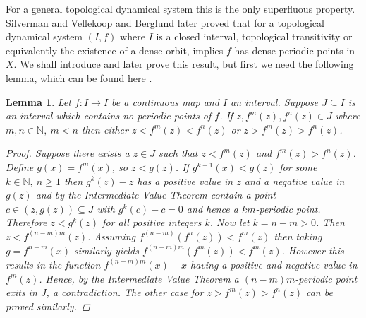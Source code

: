 \documentclass[11pt,a4paper,oneside]{memoir}
\theoremstyle{plain}
\newtheorem{lem}[thm]{Lemma}
\theoremstyle{definition}
\begin{document}
For a general topological dynamical system this is the only superfluous property. Silverman \cite{silverman} and Vellekoop and Berglund \cite{vellekoop-berglund} later proved that for a topological dynamical system $(I, f)$ where $I$ is a closed interval, topological transitivity or equivalently the existence of a dense orbit, implies $f$ has dense periodic points in $X$. We shall introduce and later prove this result, but first we need the following lemma, which can be found here \cite[Section 4.1]{block-coppel}.

\begin{lem} \label{lem:closed-interval-no-periodic-points}
    Let $f: I \to I$ be a continuous map and $I$ an interval. Suppose $J \subseteq I$ is an interval which contains no periodic points of $f$. If $z, f^m(z), f^n(z) \in J$ where $m, n \in \mathbb{N}, \ m < n$ then either $z < f^m(z) < f^n(z)$ or $z > f^m(z) > f^n(z)$.
    \begin{proof}
        Suppose there exists a $z \in J$ such that $z < f^m(z)$ and $f^m(z) > f^n(z)$. Define $g(x) = f^m(x)$, so $z < g(z)$. If $g^{k+1}(x) < g(z)$ for some $k \in \mathbb{N}, \ n \geq 1$ then $g^k(z) - z$ has a positive value in $z$ and a negative value in $g(z)$ and by the Intermediate Value Theorem contain a point $c \in (z, g(z)) \subseteq J$ with $g^k(c) - c = 0$ and hence a $km$-periodic point. Therefore $z < g^k(z)$ for all positive integers $k$. Now let $k = n - m > 0$. Then $z < f^{(n - m)m}(z)$. Assuming $f^{(n-m)}(f^n(z)) < f^m(z)$ then taking $g = f^{n-m}(x)$ similarly yields $f^{(n-m)m}(f^m(z)) < f^m(z)$. However this results in the function $f^{(n-m)m}(x) - x$ having a positive and negative value in $f^m(z)$. Hence, by the Intermediate Value Theorem a $(n-m)m$-periodic point exits in $J$, a contradiction. The other case for $z > f^m(z) > f^n(z)$ can be proved similarly.
    \end{proof}
\end{lem}
\end{document}
